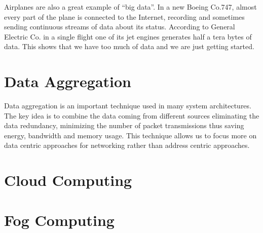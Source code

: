 		Airplanes are also a great example of ``big data''. 
		In a new Boeing Co.747, almost every part of the plane is connected to the Internet, recording and sometimes sending continuous streams of data about its status.
		According to General Electric Co. in a single flight one of its jet engines generates half a tera bytes of data.
		This shows that we have too much of data and we are just getting started.

	\section{Data Aggregation}

		Data aggregation is an important technique used in many system architectures. 
		The key idea is to combine the data coming from different sources eliminating the data redundancy, minimizing the number of packet transmissions thus saving energy, bandwidth and memory usage.
		This technique allows us to focus more on data centric approaches for networking rather than address centric approaches.  \cite{krishnamachari2002impact}  

	\section{Cloud Computing}

	\section{Fog Computing}

		\subsubsection{}


